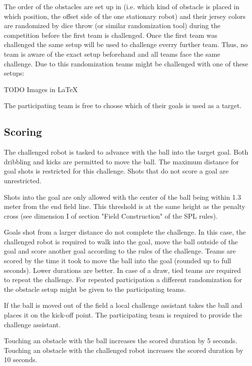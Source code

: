 The order of the obstacles are set up in (i.e. which kind of obstacle is placed in which position, the offset side of the one stationary robot) and their jersey colors are randomized by dice throw (or similar randomization tool) during the competition before the first team is challenged. Once the first team was challenged the same setup will be used to challenge everry further team. Thus, no team is aware of the exact setup beforehand and all teams face the same challenge. Due to this randomization teams might be challenged with one of these setups:

TODO Images in \LaTeX

The participating team is free to choose which of their goals is used as a target.

\subsection{Scoring}

The challenged robot is tasked to advance with the ball into the target goal. Both dribbling and kicks are permitted to move the ball. The maximum distance for goal shots is restricted for this challenge. Shots that do not score a goal are unrestricted.

Shots into the goal are only allowed with the center of the ball being within 1.3 meter from the end field line. This threshold is at the same height as the penalty cross (see dimension I of section "Field Construction" of the SPL rules).

Goals shot from a larger distance do not complete the challenge. In this case, the challenged robot is required to walk into the goal, move the ball outside of the goal and score another goal according to the rules of the challenge.
Teams are scored by the time it took to move the ball into the goal (rounded up to full seconds). Lower durations are better. In case of a draw, tied teams are required to repeat the challenge. For repeated participation a different randomization for the obstacle setup might be given to the participating teams.

If the ball is moved out of the field a local challenge assistant takes the ball and places it on the kick-off point. The participating team is required to provide the challenge assistant.

Touching an obstacle with the ball increases the scored duration by 5 seconds. Touching an obstacle with the challenged robot increases the scored duration by 10 seconds.

